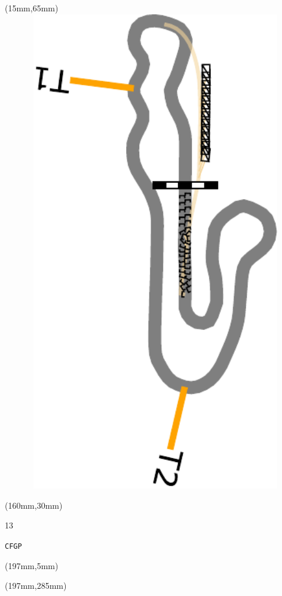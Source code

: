 \begin{textblock*}{185mm}(15mm,65mm)%
\centering
\mbox{\includegraphics[width=185mm,height=210mm,keepaspectratio]{PT/CFGP.pdf}}
\end{textblock*}
\begin{textblock*}{40mm}(160mm,30mm)%
\Large
\par{} 
\par13 
\par\hfill\tiny\tt CFGP\\
\end{textblock*}
\begin{textblock*}{20mm}(197mm,5mm)%
\fbox{\thepage}
\label{CFGP}
\end{textblock*}
\begin{textblock*}{20mm}(197mm,285mm)%
\fbox{\thepage}
\end{textblock*}

